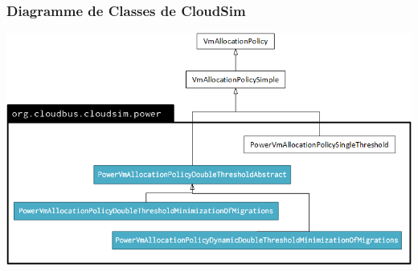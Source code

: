 \documentclass[xcolor=dvipsnames]{beamer}
\begin{document}
\begin{frame}
\frametitle{ Diagramme de Classes de CloudSim}
\begin{center}
\includegraphics[scale=0.50]{CloudSimclass.png}
\end{center}
\end{frame}
\end{document}
